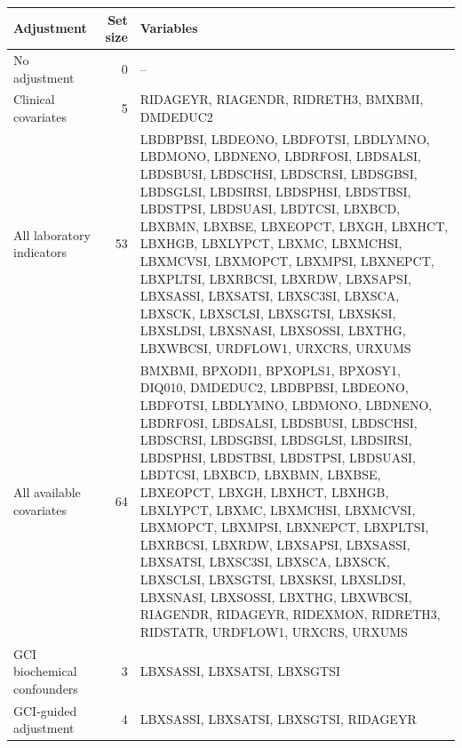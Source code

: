 \begin{tabular}{lrl}
\toprule
Adjustment & Set size & Variables \\
\midrule
No adjustment & 0 & -- \\
Clinical covariates & 5 & RIDAGEYR, RIAGENDR, RIDRETH3, BMXBMI, DMDEDUC2 \\
All laboratory indicators & 53 & LBDBPBSI, LBDEONO, LBDFOTSI, LBDLYMNO, LBDMONO, LBDNENO, LBDRFOSI, LBDSALSI, LBDSBUSI, LBDSCHSI, LBDSCRSI, LBDSGBSI, LBDSGLSI, LBDSIRSI, LBDSPHSI, LBDSTBSI, LBDSTPSI, LBDSUASI, LBDTCSI, LBXBCD, LBXBMN, LBXBSE, LBXEOPCT, LBXGH, LBXHCT, LBXHGB, LBXLYPCT, LBXMC, LBXMCHSI, LBXMCVSI, LBXMOPCT, LBXMPSI, LBXNEPCT, LBXPLTSI, LBXRBCSI, LBXRDW, LBXSAPSI, LBXSASSI, LBXSATSI, LBXSC3SI, LBXSCA, LBXSCK, LBXSCLSI, LBXSGTSI, LBXSKSI, LBXSLDSI, LBXSNASI, LBXSOSSI, LBXTHG, LBXWBCSI, URDFLOW1, URXCRS, URXUMS \\
All available covariates & 64 & BMXBMI, BPXODI1, BPXOPLS1, BPXOSY1, DIQ010, DMDEDUC2, LBDBPBSI, LBDEONO, LBDFOTSI, LBDLYMNO, LBDMONO, LBDNENO, LBDRFOSI, LBDSALSI, LBDSBUSI, LBDSCHSI, LBDSCRSI, LBDSGBSI, LBDSGLSI, LBDSIRSI, LBDSPHSI, LBDSTBSI, LBDSTPSI, LBDSUASI, LBDTCSI, LBXBCD, LBXBMN, LBXBSE, LBXEOPCT, LBXGH, LBXHCT, LBXHGB, LBXLYPCT, LBXMC, LBXMCHSI, LBXMCVSI, LBXMOPCT, LBXMPSI, LBXNEPCT, LBXPLTSI, LBXRBCSI, LBXRDW, LBXSAPSI, LBXSASSI, LBXSATSI, LBXSC3SI, LBXSCA, LBXSCK, LBXSCLSI, LBXSGTSI, LBXSKSI, LBXSLDSI, LBXSNASI, LBXSOSSI, LBXTHG, LBXWBCSI, RIAGENDR, RIDAGEYR, RIDEXMON, RIDRETH3, RIDSTATR, URDFLOW1, URXCRS, URXUMS \\
GCI biochemical confounders & 3 & LBXSASSI, LBXSATSI, LBXSGTSI \\
GCI-guided adjustment & 4 & LBXSASSI, LBXSATSI, LBXSGTSI, RIDAGEYR \\
\bottomrule
\end{tabular}
